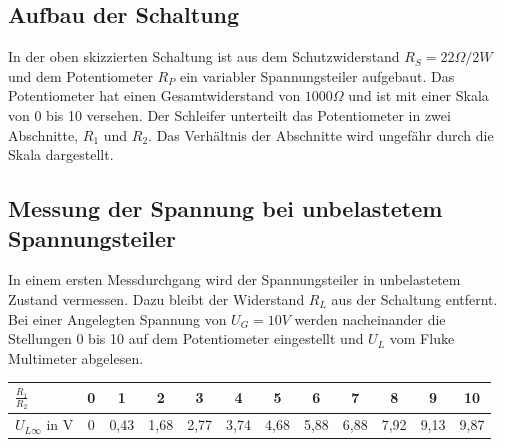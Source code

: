 \documentclass[
a4paper,     %
 headsepline, %
11pt         %
]{scrartcl}  %
\begin{document}
\begin{center}
\end{center}

\subsection{Aufbau der Schaltung}

In der oben skizzierten Schaltung ist aus dem Schutzwiderstand $R_S=22\Omega/2W$ und dem Potentiometer $R_P$ ein variabler Spannungsteiler aufgebaut. Das Potentiometer hat einen Gesamtwiderstand von $1000\Omega$ und ist mit einer Skala von 0 bis 10 versehen. Der Schleifer unterteilt das Potentiometer in zwei Abschnitte, $R_1$ und $R_2$. Das Verhältnis der Abschnitte wird ungefähr durch die Skala dargestellt.

\subsection{Messung der Spannung bei unbelastetem Spannungsteiler}

In einem ersten Messdurchgang wird der Spannungsteiler in unbelastetem Zustand vermessen. Dazu bleibt der Widerstand $R_L$ aus der Schaltung entfernt. Bei einer Angelegten Spannung von $U_G=10V$ werden nacheinander die Stellungen 0 bis 10 auf dem Potentiometer eingestellt und $U_L$ vom Fluke Multimeter abgelesen.
\begin{center}
  \begin{tabular}{ l | c | c | c | c | c | c | c | c | c | c | c }
    \hline
    $\frac{R_1}{R_2}$  & 0    & 1    & 2    & 3    & 4    & 5    & 6    & 7    & 8    & 9    & 10       \\ \hline
    $U_{L\infty}$ in V & 0    & 0,43 & 1,68 & 2,77 & 3,74 & 4,68 & 5,88 & 6,88 & 7,92 & 9,13 & 9,87     \\
    \hline
  \end{tabular}
\end{center}
\end{document}
